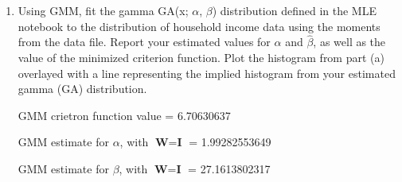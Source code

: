 \documentclass[letterpaper,12pt]{article}
\theoremstyle{definition}
\begin{document}
\begin{enumerate}
\begin{enumerate}
\item Using GMM, fit the gamma GA(x; $\alpha$, $\beta$) distribution defined in the MLE notebook to the distribution of household income data using the moments from the data file. Report your estimated values for $\hat{\alpha}$  and  $\hat{\beta}$, as well as the value of the minimized criterion function. Plot the histogram from part (a) overlayed with a line representing the implied histogram from your estimated gamma (GA) distribution.
\par
\begin{figure}[H]\centering\captionsetup{width=4.0in}
\end{figure}
\par
GMM crietron function value = 6.70630637\par
GMM estimate for $\alpha$, with  $\textbf{W} = \textbf{I}$ = 1.99282553649 \par
GMM estimate for $\beta$, with $\textbf{W} = \textbf{I}$ = 27.1613802317\par
\bigskip


\end{enumerate}
\end{enumerate}
\end{document}
